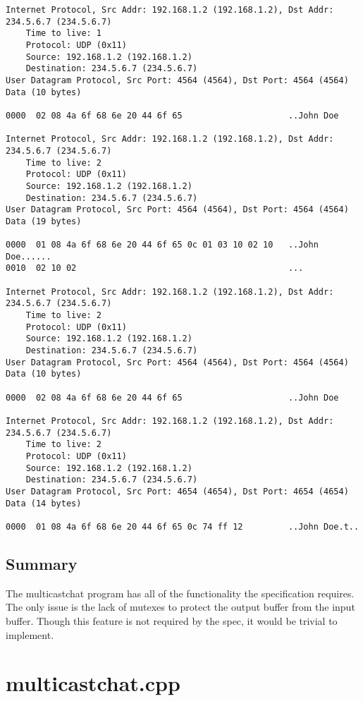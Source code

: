 \documentclass[11pt]{report}
\begin{document}
\begin{verbatim}
Internet Protocol, Src Addr: 192.168.1.2 (192.168.1.2), Dst Addr: 234.5.6.7 (234.5.6.7)
    Time to live: 1
    Protocol: UDP (0x11)
    Source: 192.168.1.2 (192.168.1.2)
    Destination: 234.5.6.7 (234.5.6.7)
User Datagram Protocol, Src Port: 4564 (4564), Dst Port: 4564 (4564)
Data (10 bytes)

0000  02 08 4a 6f 68 6e 20 44 6f 65                     ..John Doe

Internet Protocol, Src Addr: 192.168.1.2 (192.168.1.2), Dst Addr: 234.5.6.7 (234.5.6.7)
    Time to live: 2
    Protocol: UDP (0x11)
    Source: 192.168.1.2 (192.168.1.2)
    Destination: 234.5.6.7 (234.5.6.7)
User Datagram Protocol, Src Port: 4564 (4564), Dst Port: 4564 (4564)
Data (19 bytes)

0000  01 08 4a 6f 68 6e 20 44 6f 65 0c 01 03 10 02 10   ..John Doe......
0010  02 10 02                                          ...

Internet Protocol, Src Addr: 192.168.1.2 (192.168.1.2), Dst Addr: 234.5.6.7 (234.5.6.7)
    Time to live: 2
    Protocol: UDP (0x11)
    Source: 192.168.1.2 (192.168.1.2)
    Destination: 234.5.6.7 (234.5.6.7)
User Datagram Protocol, Src Port: 4564 (4564), Dst Port: 4564 (4564)
Data (10 bytes)

0000  02 08 4a 6f 68 6e 20 44 6f 65                     ..John Doe

Internet Protocol, Src Addr: 192.168.1.2 (192.168.1.2), Dst Addr: 234.5.6.7 (234.5.6.7)
    Time to live: 2
    Protocol: UDP (0x11)
    Source: 192.168.1.2 (192.168.1.2)
    Destination: 234.5.6.7 (234.5.6.7)
User Datagram Protocol, Src Port: 4654 (4654), Dst Port: 4654 (4654)
Data (14 bytes)

0000  01 08 4a 6f 68 6e 20 44 6f 65 0c 74 ff 12         ..John Doe.t..
\end{verbatim}

\section{Summary}

The multicastchat program has all of the functionality the specification requires. The only issue is the lack of mutexes to protect the output buffer from the input buffer. Though this feature is not required by the spec, it would be trivial to implement.

\appendix

\chapter{multicastchat.cpp}

\end{document}
